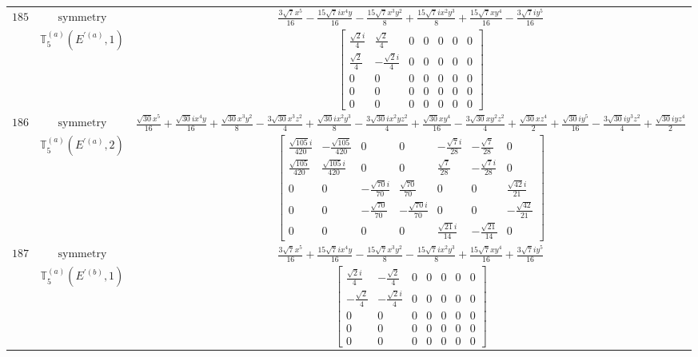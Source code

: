 \documentclass[fleqn,8pt,landscape]{jsarticle}
\begin{document}
\begin{longtable}{ccc}
$ 185 $ & $ \text{symmetry} $ & $ \frac{3 \sqrt{7} x^{5}}{16} - \frac{15 \sqrt{7} i x^{4} y}{16} - \frac{15 \sqrt{7} x^{3} y^{2}}{8} + \frac{15 \sqrt{7} i x^{2} y^{3}}{8} + \frac{15 \sqrt{7} x y^{4}}{16} - \frac{3 \sqrt{7} i y^{5}}{16} $ \\
$  $ & $ \mathbb{T}_{5}^{(a)}(E^{\prime(a)},1) $ & $ \begin{bmatrix} \frac{\sqrt{2} i}{4} & \frac{\sqrt{2}}{4} & 0 & 0 & 0 & 0 & 0 \\ \frac{\sqrt{2}}{4} & - \frac{\sqrt{2} i}{4} & 0 & 0 & 0 & 0 & 0 \\ 0 & 0 & 0 & 0 & 0 & 0 & 0 \\ 0 & 0 & 0 & 0 & 0 & 0 & 0 \\ 0 & 0 & 0 & 0 & 0 & 0 & 0 \end{bmatrix} $ \\ \hline
$ 186 $ & $ \text{symmetry} $ & $ \frac{\sqrt{30} x^{5}}{16} + \frac{\sqrt{30} i x^{4} y}{16} + \frac{\sqrt{30} x^{3} y^{2}}{8} - \frac{3 \sqrt{30} x^{3} z^{2}}{4} + \frac{\sqrt{30} i x^{2} y^{3}}{8} - \frac{3 \sqrt{30} i x^{2} y z^{2}}{4} + \frac{\sqrt{30} x y^{4}}{16} - \frac{3 \sqrt{30} x y^{2} z^{2}}{4} + \frac{\sqrt{30} x z^{4}}{2} + \frac{\sqrt{30} i y^{5}}{16} - \frac{3 \sqrt{30} i y^{3} z^{2}}{4} + \frac{\sqrt{30} i y z^{4}}{2} $ \\
$  $ & $ \mathbb{T}_{5}^{(a)}(E^{\prime(a)},2) $ & $ \begin{bmatrix} \frac{\sqrt{105} i}{420} & - \frac{\sqrt{105}}{420} & 0 & 0 & - \frac{\sqrt{7} i}{28} & - \frac{\sqrt{7}}{28} & 0 \\ \frac{\sqrt{105}}{420} & \frac{\sqrt{105} i}{420} & 0 & 0 & \frac{\sqrt{7}}{28} & - \frac{\sqrt{7} i}{28} & 0 \\ 0 & 0 & - \frac{\sqrt{70} i}{70} & \frac{\sqrt{70}}{70} & 0 & 0 & \frac{\sqrt{42} i}{21} \\ 0 & 0 & - \frac{\sqrt{70}}{70} & - \frac{\sqrt{70} i}{70} & 0 & 0 & - \frac{\sqrt{42}}{21} \\ 0 & 0 & 0 & 0 & \frac{\sqrt{21} i}{14} & - \frac{\sqrt{21}}{14} & 0 \end{bmatrix} $ \\ \hline
$ 187 $ & $ \text{symmetry} $ & $ \frac{3 \sqrt{7} x^{5}}{16} + \frac{15 \sqrt{7} i x^{4} y}{16} - \frac{15 \sqrt{7} x^{3} y^{2}}{8} - \frac{15 \sqrt{7} i x^{2} y^{3}}{8} + \frac{15 \sqrt{7} x y^{4}}{16} + \frac{3 \sqrt{7} i y^{5}}{16} $ \\
$  $ & $ \mathbb{T}_{5}^{(a)}(E^{\prime(b)},1) $ & $ \begin{bmatrix} \frac{\sqrt{2} i}{4} & - \frac{\sqrt{2}}{4} & 0 & 0 & 0 & 0 & 0 \\ - \frac{\sqrt{2}}{4} & - \frac{\sqrt{2} i}{4} & 0 & 0 & 0 & 0 & 0 \\ 0 & 0 & 0 & 0 & 0 & 0 & 0 \\ 0 & 0 & 0 & 0 & 0 & 0 & 0 \\ 0 & 0 & 0 & 0 & 0 & 0 & 0 \end{bmatrix} $ \\ \hline

\end{longtable}
\end{document}
